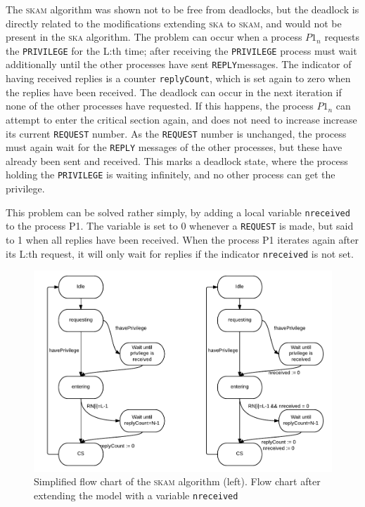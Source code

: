 \documentclass[a4paper,10pt]{llncs}
\begin{document}
The \textsc{skam} algorithm was shown not to be free from deadlocks, but the deadlock is directly related to the modifications extending \textsc{ska} to \textsc{skam}, and would not be present in the \textsc{ska} algorithm. The problem can occur when a process $P1_n$ requests the \texttt{PRIVILEGE} for the L:th time; after receiving the \texttt{PRIVILEGE} process must wait additionally until the other processes have sent \texttt{REPLY}messages. The indicator of having received replies is a counter \texttt{replyCount}, which is set again to zero when the replies have been received. The deadlock can occur in the next iteration if none of the other processes have requested. If this happens, the process $P1_n$ can attempt to enter the critical section again, and does not need to increase increase its current \texttt{REQUEST} number. As the \texttt{REQUEST} number is unchanged, the process must again wait for the \texttt{REPLY} messages of the other processes, but these have already been sent and received. This marks a deadlock state, where the process holding the \texttt{PRIVILEGE} is waiting infinitely, and no other process can get the privilege. 

This problem can be solved rather simply, by adding a local variable \texttt{nreceived} to the process P1. The variable is set to 0 whenever a \texttt{REQUEST} is made, but said to 1 when all replies have been received. When the process P1 iterates again after its L:th request, it will only wait for replies if the indicator \texttt{nreceived} is not set.


\begin{figure}[]
\begin{center}
\includegraphics[width=\textwidth]{diagramboth.pdf}
 \caption[Close up of \textit{Hemidactylus} sp.]
   {Simplified flow chart of the \textsc{skam} algorithm (left). Flow chart after extending the model with a variable \texttt{nreceived}}
\end{center}
\end{figure}
\end{document}
